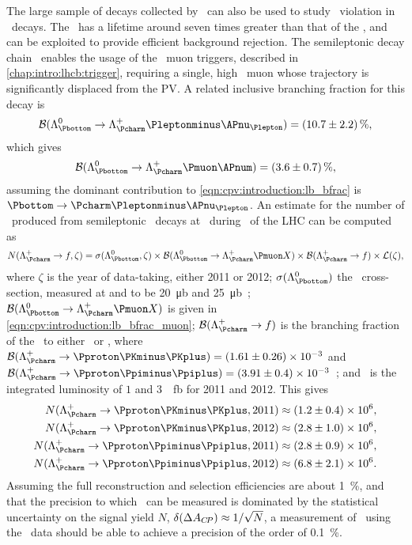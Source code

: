 The large sample of \PB decays collected by \lhcb\ can also be used to study 
\CP\ violation in \PLambdac\ decays.
The \PLambdab\ has a lifetime around seven times greater than that of the 
\PLambdac, and can be exploited to provide efficient background rejection.
The semileptonic decay chain \LbToLcmuX\ enables the usage of the \lhcb\ muon 
triggers, described in \cref{chap:intro:lhcb:trigger}, requiring a single, high 
\pT\ muon whose trajectory is significantly displaced from the \ac{PV}.
A related inclusive branching fraction for this decay is~\cite{PDG2014}
\begin{equation}
  \bfrac(\decay{\PLambdab}{\PLambdac\Pleptonminus\APnu_{\Plepton}}) =
    \SI{10.7 \pm 2.2}{\percent},
  \label{eqn:cpv:introduction:lb_bfrac}
\end{equation}
which gives
\begin{equation}
  \bfrac(\decay{\PLambdab}{\PLambdac\Pmuon\APnum}) =
    \SI{3.6 \pm 0.7}{\percent},
  \label{eqn:cpv:introduction:lb_bfrac_muon}
\end{equation}
assuming the dominant contribution to \cref{eqn:cpv:introduction:lb_bfrac} is 
$\decay{\Pbottom}{\Pcharm\Pleptonminus\APnu_{\Plepton}}$.
An estimate for the number of \LcTophh\ produced from semileptonic \PLambdab\ 
decays at \lhcb\ during \runone\ of the \ac{LHC} can be computed as
\begin{equation}
  N(\LcTof, \zeta) =
    \xsec(\PLambdab, \zeta)\times
    \bfrac(\LbToLcmuX)\times
    \bfrac(\LcTof)\times
    \lumi(\zeta),
\end{equation}
where $\zeta$ is the year of data-taking, either 2011 or 2012; 
$\xsec(\PLambdab)$ the \PLambdab\ cross-section, measured at  and 
\sqrtseq{8} to be \SI{20}{\micro\barn} and 
\SI{25}{\micro\barn}~\cite{Aaij:2015fea}; $\bfrac(\LbToLcmuX)$ is given in 
\cref{eqn:cpv:introduction:lb_bfrac_muon}; $\bfrac(\LcTof)$ is the branching 
fraction of the \PLambdac\ to either \pKK\ or \ppipi, where $\bfrac(\LcTopKK) = 
(1.61 \pm 0.26)\times 10^{-3}$ and $\bfrac(\LcToppipi) = (3.91 \pm 0.4)\times 
10^{-3}$~\cite{Ablikim:2016tze}; and \lumi\ is the integrated luminosity of $1$ 
and \SI{3}{\per\femto\barn} for 2011 and 2012.
This gives
\begin{align}
  N(\LcTopKK, 2011) &\approx (1.2 \pm 0.4) \times 10^{6},\nonumber\\
  N(\LcTopKK, 2012) &\approx (2.8 \pm 1.0) \times 10^{6},\nonumber\\
  N(\LcToppipi, 2011) &\approx (2.8 \pm 0.9) \times 10^{6},\nonumber\\
  N(\LcToppipi, 2012) &\approx (6.8 \pm 2.1) \times 10^{6}.
\end{align}
Assuming the full reconstruction and selection efficiencies are about 
\SI{1}{\percent}, and that the precision to which \dACP\ can be measured is 
dominated by the statistical uncertainty on the signal yield $N$, $\delta(\Delta A_{C\!P}) 
\approx 1/\sqrt{N}$, a measurement of \dACP\ using the \runone\ data should be 
able to achieve a precision of the order of \SI{0.1}{\percent}.

